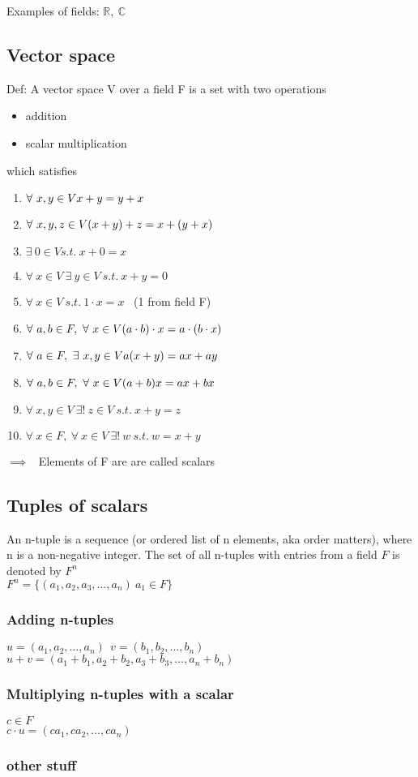 \documentclass[a4paper]{article}
\begin{document}
Examples of fields: $\mathbb{R},\ \mathbb{C}$

\subsection{Vector space}
Def: A vector space V over a field F is a set with two operations
\begin{itemize}
	\item{addition}
	\item {scalar multiplication}
\end{itemize}
which satisfies
\begin{enumerate}
	\item{$\forall \ x,y \in V \\ x + y = y + x$}
	\item{$\forall \ x,y,z \in V \\ (x + y) + z = x + (y + x)$}
	\item{$\exists \ 0 \in V s.t. \ x + 0 = x $}
	\item{$\forall \ x \in V\ \exists \ y \in V\ s.t. \ x + y = 0$}
	\item{$\forall \ x \in V \ s.t. \ 1 \cdot x = x$ \ (1 from field F)}
	\item{$\forall \ a,b \in F, \  \forall \ x \in V \\ (a \cdot b) \cdot x = a \cdot ( b \cdot x)$}
	\item{$\forall \ a \in F, \ \exists \ x,y \in V \\ a(x + y) = ax + ay$}
	\item{$\forall \ a,b \in F, \ \forall \ x \in V \\ (a + b)x = ax + bx $}
	\item{$\forall \ x,y \in V\ \exists ! \ z \in V\ s.t. \ x + y = z$}
	\item{$\forall \ x \in F,\ \forall \ x \in V \ \exists ! \ w \ s.t. \ w = x + y$}
\end{enumerate}

$\implies$ \ Elements of F are are called scalars

\subsection{Tuples of scalars}
An n-tuple is a sequence (or ordered list of n elements, aka order matters), where n is a non-negative integer. The set of all n-tuples with entries from a field $F$ is denoted by $F^n$\\
$F^n = \{(a_1, a_2, a_3, \dots, a_n) \ a_1 \in F\}$
\subsubsection{Adding n-tuples}
$u = (a_1, a_2,\dots, a_n) \ \ v = (b_1, b_2,\dots, b_n) $\\
$u + v = (a_1 + b_1, a_2 + b_2, a_3 + b_3, \dots, a_n + b_n)$
\subsubsection{Multiplying n-tuples with a scalar}
$c \in F$\\
$c \cdot u = (ca_1, ca_2,\dots, ca_n) $
\subsubsection{other stuff}
\end{document}
